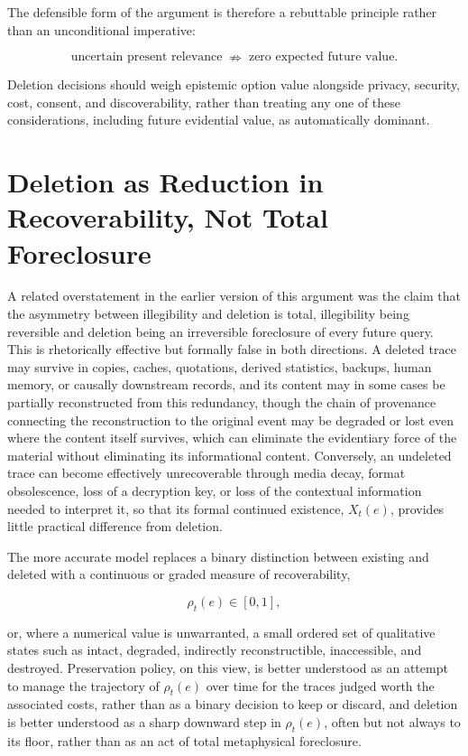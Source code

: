 \documentclass[11pt]{article}
\begin{document}
The defensible form of the argument is therefore a rebuttable principle rather than an unconditional imperative:

\[
\text{uncertain present relevance} \;\nRightarrow\; \text{zero expected future value}.
\]

Deletion decisions should weigh epistemic option value alongside privacy, security, cost, consent, and discoverability, rather than treating any one of these considerations, including future evidential value, as automatically dominant.

\section{Deletion as Reduction in Recoverability, Not Total Foreclosure}

A related overstatement in the earlier version of this argument was the claim that the asymmetry between illegibility and deletion is total, illegibility being reversible and deletion being an irreversible foreclosure of every future query. This is rhetorically effective but formally false in both directions. A deleted trace may survive in copies, caches, quotations, derived statistics, backups, human memory, or causally downstream records, and its content may in some cases be partially reconstructed from this redundancy, though the chain of provenance connecting the reconstruction to the original event may be degraded or lost even where the content itself survives, which can eliminate the evidentiary force of the material without eliminating its informational content. Conversely, an undeleted trace can become effectively unrecoverable through media decay, format obsolescence, loss of a decryption key, or loss of the contextual information needed to interpret it, so that its formal continued existence, $X_t(e)$, provides little practical difference from deletion.

The more accurate model replaces a binary distinction between existing and deleted with a continuous or graded measure of recoverability,

\[
\rho_t(e) \in [0,1],
\]

or, where a numerical value is unwarranted, a small ordered set of qualitative states such as intact, degraded, indirectly reconstructible, inaccessible, and destroyed. Preservation policy, on this view, is better understood as an attempt to manage the trajectory of $\rho_t(e)$ over time for the traces judged worth the associated costs, rather than as a binary decision to keep or discard, and deletion is better understood as a sharp downward step in $\rho_t(e)$, often but not always to its floor, rather than as an act of total metaphysical foreclosure.
\end{document}
